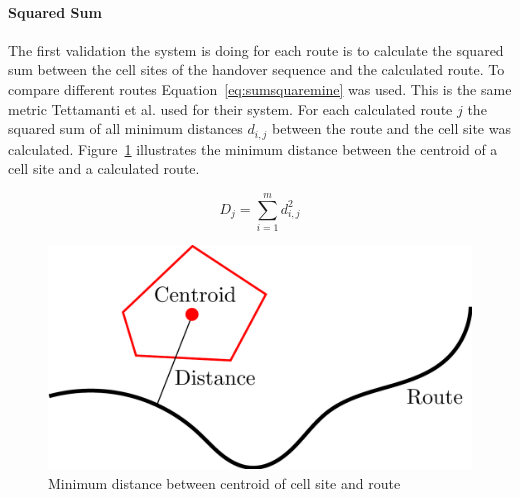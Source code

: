 \paragraph{Squared Sum}
The first validation the system is doing for each route is to calculate the squared sum between the cell sites of the handover sequence and the calculated route. To compare different routes Equation~\ref{eq:sumsquaremine} was used. This is the same metric Tettamanti et al.\cite{Tettamanti2010} used for their system. For each calculated route $j$ the squared sum of all minimum distances $d_{i,j}$  between the route and the cell site was calculated. Figure~\ref{fig:rms} illustrates the minimum distance between the centroid of a cell site and a calculated route.

\begin{equation}
	\label{eq:sumsquaremine}
	D_j=\sum_{i=1}^{m} d_{i,j}^{2}
\end{equation}
\begin{figure}
	\centering
	\includegraphics[width=0.7\linewidth]{./images/rms}
	\caption{Minimum distance between centroid of cell site and route}
	\label{fig:rms}
\end{figure}


